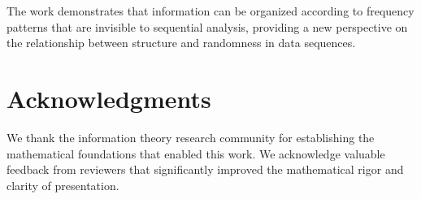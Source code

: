 \documentclass[10pt,journal,compsoc]{IEEEtran}
\begin{document}
The work demonstrates that information can be organized according to frequency patterns that are invisible to sequential analysis, providing a new perspective on the relationship between structure and randomness in data sequences.

\section*{Acknowledgments}

We thank the information theory research community for establishing the mathematical foundations that enabled this work. We acknowledge valuable feedback from reviewers that significantly improved the mathematical rigor and clarity of presentation.



\end{document}
